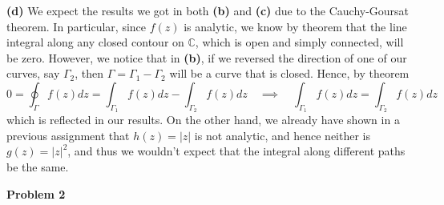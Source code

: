 \documentclass[10pt]{article}
\newcommand{\C}{\mathbb{C}}
\begin{document}
\textbf{(d)}
We expect the results we got in both \textbf{(b)} and \textbf{(c)} due to the Cauchy-Goursat theorem. In particular, since $f(z)$ is analytic, we know by theorem that the line integral along any closed contour on $\C$, which is open and simply connected, will be zero. However, we notice that in \textbf{(b)}, if we reversed the direction of one of our curves, say $\Gamma_{2}$, then $\Gamma = \Gamma_{1} - \Gamma_{2}$ will be a curve that is closed. Hence, by theorem
$$ 0 = \oint_{\Gamma}f(z)dz = \int_{\Gamma_{1}}f(z)dz - \int_{\Gamma_{2}}f(z)dz \hspace{1em} \implies \hspace{1em} \int_{\Gamma_{1}}f(z)dz = \int_{\Gamma_{2}}f(z)dz$$
which is reflected in our results. On the other hand, we already have shown in a previous assignment that $h(z) = |z|$ is not analytic, and hence neither is $g(z) = |z|^{2}$, and thus we wouldn't expect that the integral along different paths be the same.

\textbf{Problem 2}
\end{document}
